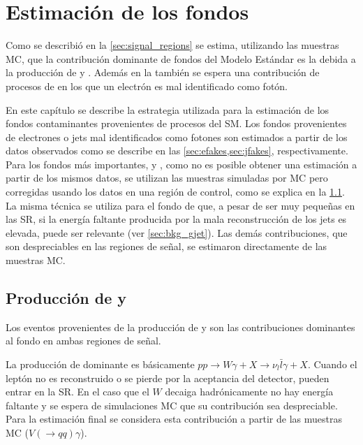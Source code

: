 \chapter{Estimación de los fondos} \label{cap:fondos}

Como se describió en la \cref{sec:signal_regions} se estima, utilizando las
muestras MC, que la contribución dominante de fondos del Modelo
Estándar es la debida a la producción de {\wgam} y {\ttgam}. Además en la {\SRL} también se
espera una contribución de procesos de {\ttbar} en los que un electrón es mal
identificado como fotón.

En este capítulo se describe la estrategia utilizada para la estimación de los
fondos contaminantes provenientes de procesos del SM.
Los fondos provenientes de electrones o jets mal identificados como fotones son
estimados a partir de los datos observados como se describe en las
\cref{sec:efakes,sec:jfakes}, respectivamente. %
Para los fondos más importantes, {\wgam} y
{\ttgam}, como no es posible obtener una estimación a partir de los mismos datos, se
utilizan las muestras simuladas por MC pero corregidas usando los datos en
una región de control, como se explica en la \cref{sec:bkg_wgam_ttgam}. La
misma técnica se utiliza para el fondo de {\gjet} que, a pesar de ser
muy peque\~nas en las SR, si la energía faltante producida por la mala
reconstrucción de los jets es elevada, puede ser relevante (ver
\cref{sec:bkg_gjet}). Las demás contribuciones, que son despreciables en
las regiones de señal, se estimaron directamente de las muestras MC.



\section[Producción de {\wgam} y $tt\gamma$]{Producción de {\wgam} y {\ttgam}}
\label{sec:bkg_wgam_ttgam}

Los eventos provenientes de la producción de {\wgam} y {\ttgam} son las
contribuciones dominantes al fondo en ambas regiones de señal.

La producción de {\wgam} dominante es básicamente $pp \to W\gamma + X \to \nu_l
\bar{l}\gamma + X$. Cuando el leptón no es reconstruido o se pierde por la
aceptancia del detector, pueden entrar en la SR. En el caso que el $W$
decaiga hadrónicamente no hay energía faltante y se espera de simulaciones MC que
su contribución sea despreciable. Para la estimación final se considera
esta contribución a partir de las muestras MC ($V(\to qq)\gamma$).

